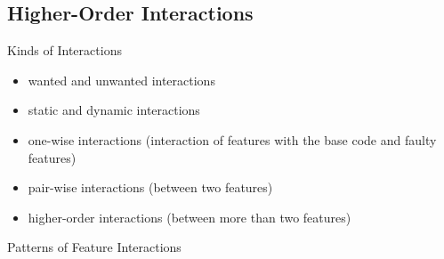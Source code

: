 \subsection{Higher-Order Interactions}
\begin{frame}{\myframetitle}
	\begin{mycolumns}
		\begin{definition}{Kinds of Interactions}
			\begin{itemize}
				\item wanted and unwanted interactions
				\item static and dynamic interactions
				\item one-wise interactions (interaction of features with the base code and faulty features)
				\item pair-wise interactions (between two features)
				\item higher-order interactions (between more than two features)
			\end{itemize}
		\end{definition}
	\mynextcolumn
		\begin{exampletight}{Patterns of Feature Interactions\mysource{\VBDb}}
		\end{exampletight}
	\end{mycolumns}
\end{frame}

